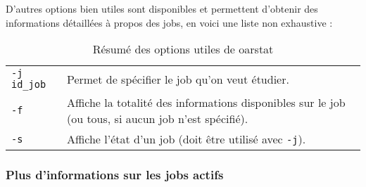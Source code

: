 \par D'autres options bien utiles sont disponibles et permettent d'obtenir des informations détaillées à propos des jobs, en voici une liste non exhaustive : \\

\begin{table}[h!]
  \centering

  \begin{tabular}{ll}
    \texttt{-j id\_job} & Permet de spécifier le job qu'on veut étudier. \\
    \texttt{-f} & Affiche la totalité des informations disponibles sur le job (ou tous, si aucun job n'est spécifié).\\
    \texttt{-s} & Affiche l'état d'un job (doit être utilisé avec \texttt{-j}).\\
  \end{tabular}

  \caption{Résumé des options utiles de oarstat}
  
\end{table}


\subsubsection{Plus d'informations sur les jobs actifs}
\label{sec:plus-dinf-sur}


